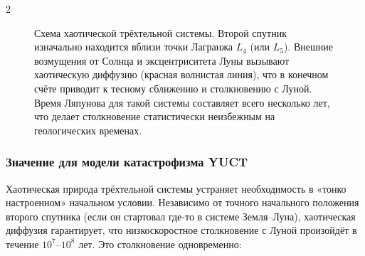 \documentclass[11pt,a4paper]{article}
\begin{document}
\begin{multicols}{2}
		\begin{figure}[H]
			\centering
			\caption{Схема хаотической трёхтельной системы. Второй спутник
				изначально находится вблизи точки Лагранжа \(L_4\) (или \(L_5\)).
				Внешние возмущения от Солнца и эксцентриситета Луны вызывают
				хаотическую диффузию (красная волнистая линия), что в конечном счёте приводит к тесному сближению
				и столкновению с Луной. Время Ляпунова для такой системы составляет
				всего несколько лет, что делает столкновение статистически неизбежным на геологических временах.}
			\label{fig:threebody}
		\end{figure}
		
		\subsubsection{Значение для модели катастрофизма YUCT}
		
		Хаотическая природа трёхтельной системы устраняет необходимость в «тонко настроенном» начальном условии.
		Независимо от точного начального положения второго спутника (если он стартовал где-то в системе Земля–Луна),
		хаотическая диффузия гарантирует, что низкоскоростное столкновение с Луной произойдёт в течение \(10^{7}\)–\(10^{8}\) лет. Это столкновение одновременно:
		

\end{multicols}
\end{document}
